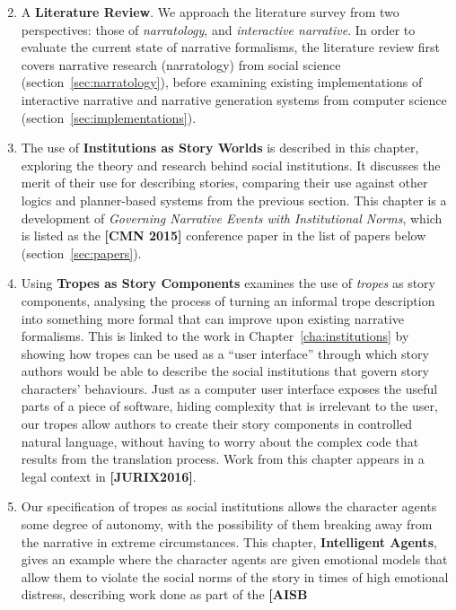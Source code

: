 \documentclass[11pt]{report}
\begin{document}
\begin{enumerate}[{Chapter} 1:]
\setcounter{enumi}{1}
\item A \textbf{Literature Review}.
  We approach the literature survey from two perspectives: those of \emph{narratology},
  and \emph{interactive narrative}.
  In order to evaluate the current state of narrative formalisms, the literature review first covers narrative research
  (narratology) from social science (section~\ref{sec:narratology}), before
  examining existing implementations of interactive narrative and narrative
  generation systems from computer science
  (section~\ref{sec:implementations}).
\item The use of \textbf{Institutions as Story Worlds} is described in
  this chapter, exploring the theory and research behind
  social institutions. It discusses the merit of their use for describing
  stories, comparing their use against other logics and planner-based systems
  from the previous section. This chapter is a development of \emph{Governing
    Narrative Events with Institutional Norms}, which is listed as
  the \textbf{[CMN 2015]} conference paper in the list of papers below (section~\ref{sec:papers}).
\item Using \textbf{Tropes as Story Components}
  examines the use of \emph{tropes} as story components, analysing the process
  of turning an informal trope description into something more formal that can improve
  upon existing narrative formalisms. This is linked to the work in
  Chapter~\ref{cha:institutions} by showing how tropes can be used as a
  ``user interface'' through which story authors would be able to
  describe the social institutions that govern story characters' behaviours.
  Just as a computer user interface exposes the useful parts of a piece of
  software, hiding complexity that is irrelevant to the user, our tropes allow
  authors to create their story components in controlled natural language,
  without having to worry about the complex code that results from the
  translation process.
  Work from this chapter appears in a legal
  context in \textbf{[JURIX2016]}.
\item Our specification of tropes as social institutions allows the character
  agents some degree of autonomy, with the possibility of them breaking away
  from the narrative in extreme circumstances.
  This chapter,
  \textbf{Intelligent Agents}, gives an example where the character
  agents are given emotional models that allow them to violate the social norms
  of the story in times of high emotional distress, describing work done as part of the \textbf{[AISB
}
\end{enumerate}
\end{document}
